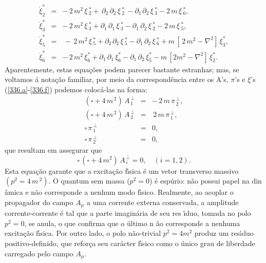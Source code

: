 \documentclass[a4paper,thmsa,12pt]{report}
\begin{document}
\begin{eqnarray}
\ddot{\xi}_{2}^{\ast }&=&-\,2\,m^{2}\,\xi \,_{2}^{\ast }+\,\partial
_{2}\,\partial _{2}\,\xi \,_{2}^{\ast }\,-\partial _{1\,}\partial _{2}\,\xi
\,_{3}^{\ast }-2\,m\,\xi \,_{6}^{\ast },  \label{340.a}
\\
\ddot{\xi}_{3}^{\ast }&=&-\,2\,m^{2}\,\xi \,_{3}^{\ast }+\partial
_{1}\,\partial _{1}\,\xi \,_{3}^{\ast }-\partial _{1}\,\partial _{2}\,\xi
\,_{2}^{\ast }-2\,m\,\xi \,_{5}^{\ast },  \label{340.b}
\\
\ddot{\xi}_{5}^{\ast }&=&\,-\,2\,m^{2}\,\xi \,_{5}^{\ast }+\partial
_{2\,}\partial _{2}\,\xi \,_{5}^{\ast }-\partial _{1}\,\partial _{2}\,\xi
\,_{6}^{\ast }+m\,\left[ \,2\,m^{2}-\nabla ^{2}\right] \,\xi _{3}^{\ast },
\label{340.c}
\\
\ddot{\xi}_{6}^{\ast }&=&-\,2\,m^{2}\,\xi _{6}^{\ast }+\partial _{1}\,\partial
_{1}\,\xi _{6}^{\ast }-\partial _{1}\,\partial _{2}\,\xi _{5}^{\ast }-m\,%
\left[ 2m^{2}-\nabla ^{2}\right] \,\xi _{2}^{\ast }.  \label{340.d}
\end{eqnarray}
Aparentemente, estas equa\c{c}\~{o}es podem parecer bastante estranhas; mas,
se voltamos \'{a} nota\c{c}\~{a}o familiar, por meio da correspond\^{e}ncia
entre os A's, $\pi $'s e $\xi $'s (\ref{336.a}-\ref{336.f}) podemos
coloc\'a-las na forma:\smallskip
\begin{eqnarray}
\left( \square +4\,m^{\,2}\right) \,A_{\,1}^{\,\perp }&=&-\,2\,m\,\pi
_{\,2}^{\,\perp },  \label{341.a}\\
\left( \square +4\,m^{\,2}\right) \,A_{\,2}^{\,\perp }&=&\,2\,m\,\pi
_{\,1}^{\,\perp },  \label{341.b}\\
\square \,\pi _{\,1}^{\,\perp }&=&0,  \label{341.c}\\
\square \,\pi _{\,2}^{\,\perp }&=&0,  \label{341.d}
\end{eqnarray}
que resultam em assegurar que
\begin{equation}
\square \,\left( \square +4\,m^{2}\right) \,A_{\,i\,}^{\,\perp }=0,\,\,\ \ \
\left( i=1,2\right) .  \label{342}
\end{equation}
Esta equa\c{c}\~{a}o garante que a excita\c{c}\~{a}o f\'{\i}sica \'{e} um
vetor transverso massivo $\left( p^{2}=4\,m\,^{2}\right) .$ O quantum sem
massa ($p^{2}$\smallskip $=0$) \'{e} esp\'{u}rio: n\~{a}o possui papel na din%
\^{a}mica e n\~{a}o corresponde a nenhum modo f\'{\i}sico. Realmente, ao
acoplar o propagador do campo $A_{\mu }$ a uma corrente externa conservada,
a amplitude corrente-corrente \'{e} tal que a parte imagin\'{a}ria de seu res%
\'{\i}duo, tomada no polo $p^{2}=0$, se anula, o que confirma que o \'{u}ltimo n%
\~{a}o corresponde a nenhuma excita\c{c}\~{a}o f\'{\i}sica. Por outro lado, o
polo n\~{a}o-trivial $p^{2}=4m^{2}$ produz um res\'{\i}duo positivo-definido,
que refor\c{c}a seu car\'{a}cter f\'{\i}sico como o \'{u}nico grau de
liberdade carregado pelo campo $A_{\mu }$.
\end{document}
